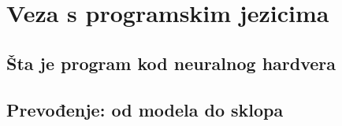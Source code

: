 \section{Veza s programskim jezicima}

\subsection{Šta je program kod neuralnog hardvera}

\subsection{Prevođenje: od modela do sklopa}

